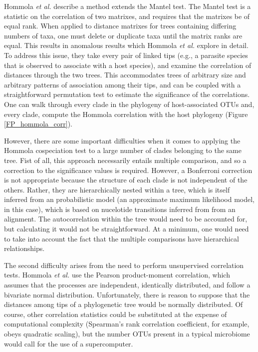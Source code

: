 Hommola {\em et al.} \cite{hommola2009permutation} describe a method extends the Mantel test. \cite{mantel1967detection} The Mantel test is a statistic on the correlation of two matrixes, and requires that the matrixes be of equal rank. When applied to distance matrixes for trees containing differing numbers of taxa, one must delete or duplicate taxa until the matrix ranks are equal. This results in anomalous results which Hommola {\em et al.} explore in detail. To address this issue, they take every pair of linked tips (e.g., a parasite species that is observed to associate with a host species), and examine the correlation of distances through the two trees. This accommodates trees of arbitrary size and arbitrary patterns of association among their tips, and can be coupled with a straightforward permutation test to estimate the significance of the correlations. One can walk through every clade in the phylogeny of host-associated OTUs and, every clade, compute the Hommola correlation with the host phylogeny (Figure \ref{FP_hommola_corr}). 



However, there are some important difficulties when it comes to applying the Hommola cospeciation test to a large number of clades belonging to the same tree. Fist of all, this approach necessarily entails multiple comparison, and so a correction to the significance values is required. However, a Bonferroni correction is not appropriate because the structure of each clade is not independent of the others. Rather, they are hierarchically nested within a tree, which is itself inferred from an probabilistic model (an approximate maximum likelihood model, in this case), which is based on nucelotide transitions inferred from from an alignment. The autocorrelation within the tree would need to be accounted for, but calculating it would not be straightforward. At a minimum, one would need to take into account the fact that the multiple comparisons have hierarchical relationships.

The second difficulty arises from the need to perform unsupervised correlation tests. Hommola {\em et al.} use the Pearson product-moment correlation, which assumes that the processes are independent, identically distributed, and follow a bivariate normal distribution. Unfortunately, there is reason to suppose that the distances among tips of a phylogenetic tree would be normally distributed. Of course, other correlation statistics could be substituted at the expense of computational complexity (Spearman's rank correlation coefficient, for example, obeys quadratic scaling), but the number OTUs present in a typical microbiome would call for the use of a supercomputer.

